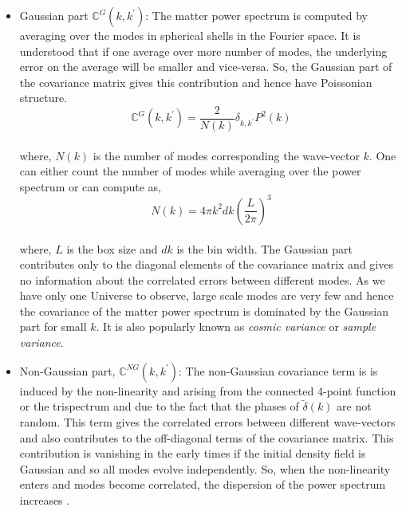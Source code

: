 \begin{itemize}
	\item Gaussian part $\mathbb{C}^{G}(k,k^{\prime})$: The matter power spectrum is computed
			by averaging over the modes in spherical shells in the Fourier space. It 
			is understood that if one average over more number of modes, the underlying
			error on the average will be smaller and vice-versa. So, the Gaussian part
			of the covariance matrix gives this contribution and hence have Poissonian
			structure. 
			\begin{equation}
				\mathbb{C}^{G}(k,k^{\prime}) = \dfrac{2}{N(k)} \delta_{k,k^{\prime}} P^2(k)
			\end{equation}
			\\
			where, $N(k)$ is the number of modes corresponding the wave-vector $k$. One 
			can either count the number of modes while averaging over the power spectrum
			or can compute as,
			\begin{equation}
				N(k) = 4 \pi k^2 dk \left( \dfrac{L}{2\pi} \right)^3
			\end{equation}
			\\
			where, $L$ is the box size and $dk$ is the bin width. The Gaussian part 
			contributes only to the diagonal elements of the covariance matrix and gives no 
			information about the correlated errors between different modes. As we have
			only one Universe to observe, large scale modes are very few and hence
			the covariance of the matter power spectrum is dominated by the Gaussian
			part for small $k$. It is also popularly known as {\it cosmic variance}
			or {\it sample variance}.

	\item Non-Gaussian part, $\mathbb{C}^{NG}(k,k^{\prime})$: The non-Gaussian covariance term is 
			is induced by the non-linearity and arising from the connected 4-point function or the trispectrum and due to the fact that the phases of $\tilde{\delta}(k)$ are 
			not random. This term gives the correlated errors between
			different wave-vectors and also contributes to the off-diagonal terms
			of the covariance matrix. This contribution is vanishing in the early 
			times if the initial density field is Gaussian and so all modes evolve
			independently. So, when the non-linearity enters and modes become
			correlated, the dispersion of the power spectrum increases 
			\cite{1999MNRAS.308.1179M}.


\end{itemize}
